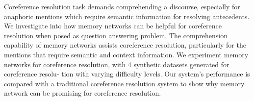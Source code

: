 Coreference resolution task demands comprehending a discourse, especially for anaphoric mentions which require semantic information for resolving antecedents. We investigate into how memory networks can be helpful for coreference resolution when posed as question answering problem. The comprehension capability of memory networks assists coreference resolution, particularly for the mentions that require semantic and context information. We experiment memory networks for coreference resolution, with 4 synthetic datasets generated for coreference resolu- tion with varying difficulty levels. Our system's performance is compared with a traditional coreference resolution system to show why memory network can be promising for coreference resolution.
